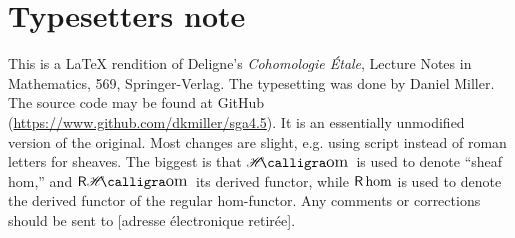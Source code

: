 
\section*{Typesetters note}

This is a \LaTeX{} rendition of Deligne's \emph{Cohomologie \'Etale}, Lecture 
Notes in Mathematics, 569, Springer-Verlag. The 
typesetting was done by Daniel Miller. The source code may be found at 
GitHub (\url{https://www.github.com/dkmiller/sga4.5}). It is an essentially 
unmodified version of the original. Most changes are slight, e.g. using 
script instead of roman letters for sheaves. The biggest is that 
$\Hom$ is used to denote ``sheaf hom,'' and $\rHom$ its derived functor, while 
$\operatorname{\mathsf{R}\hom}$ is used to denote the derived functor of the regular hom-functor. Any 
comments or corrections should be sent to [adresse électronique retirée].